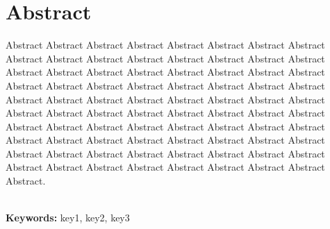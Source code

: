 \chapter*{\center \Large  Abstract}
Abstract Abstract Abstract Abstract Abstract Abstract Abstract Abstract Abstract Abstract Abstract Abstract Abstract Abstract Abstract Abstract Abstract Abstract Abstract Abstract Abstract Abstract Abstract Abstract Abstract Abstract Abstract Abstract Abstract Abstract Abstract Abstract Abstract Abstract Abstract Abstract Abstract Abstract Abstract Abstract Abstract Abstract Abstract Abstract Abstract Abstract Abstract Abstract Abstract Abstract Abstract Abstract Abstract Abstract Abstract Abstract Abstract Abstract Abstract Abstract Abstract Abstract Abstract Abstract Abstract Abstract Abstract Abstract Abstract Abstract Abstract Abstract Abstract Abstract Abstract Abstract Abstract Abstract Abstract Abstract Abstract.

~\\[1cm]
\noindent
\textbf{Keywords:} key1, key2, key3
